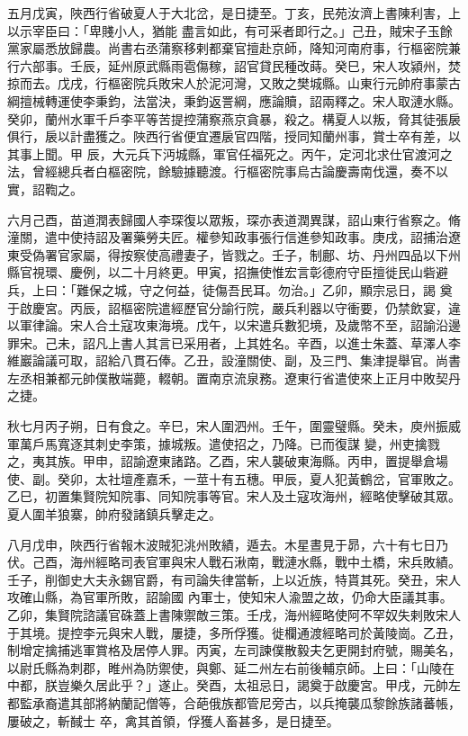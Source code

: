 \begin{pinyinscope}
 五月戊寅，陜西行省破夏人于大北岔，是日捷至。丁亥，民苑汝濟上書陳利害，上以示宰臣曰：「卑賤小人，猶能
 盡言如此，有可采者即行之。」己丑，賊宋子玉餘黨家屬悉放歸農。尚書右丞蒲察移剌都棄官擅赴京師，降知河南府事，行樞密院兼行六部事。壬辰，延州原武縣雨雹傷稼，詔官貸民種改蒔。癸巳，宋人攻潁州，焚掠而去。戊戌，行樞密院兵敗宋人於泥河灣，又敗之樊城縣。山東行元帥府事蒙古綱擅械轉運使李秉鈞，法當決，秉鈞返詈綱，應論贖，詔兩釋之。宋人取漣水縣。癸卯，蘭州水軍千戶李平等苦提控蒲察燕京貪暴，殺之。構夏人以叛，脅其徒張扆俱行，扆以計盡獲之。陜西行省便宜遷扆官四階，授同知蘭州事，賞士卒有差，以其事上聞。甲
 辰，大元兵下沔城縣，軍官任福死之。丙午，定河北求仕官渡河之法，曾經總兵者白樞密院，餘驗據聽渡。行樞密院事烏古論慶壽南伐還，奏不以實，詔鞫之。



 六月己酉，苗道潤表歸國人李琛復以眾叛，琛亦表道潤異謀，詔山東行省察之。脩潼關，遣中使持詔及署藥勞夫匠。權參知政事張行信進參知政事。庚戌，詔捕治遼東受偽署官家屬，得按察使高禮妻子，皆戮之。壬子，制鄜、坊、丹州四品以下州縣官視環、慶例，以二十月終更。甲寅，招撫使惟宏言彰德府守臣擅徙民山砦避兵，上曰：「難保之城，守之何益，徒傷吾民耳。勿治。」乙卯，顯宗忌日，謁
 奠于啟慶宮。丙辰，詔樞密院遣經歷官分諭行院，嚴兵利器以守衝要，仍禁飲宴，違以軍律論。宋人合土寇攻東海境。戊午，以宋遣兵數犯境，及歲幣不至，詔諭沿邊罪宋。己未，詔凡上書人其言已采用者，上其姓名。辛酉，以進士朱蓋、草澤人李維巖論議可取，詔給八貫石俸。乙丑，設潼關使、副，及三門、集津提舉官。尚書左丞相兼都元帥僕散端薨，輟朝。置南京流泉務。遼東行省遣使來上正月中敗契丹之捷。



 秋七月丙子朔，日有食之。辛巳，宋人圍泗州。壬午，圍靈璧縣。癸未，庾州振威軍萬戶馬寬逐其刺史李策，據城叛。遣使招之，乃降。已而復謀
 變，州吏擒戮之，夷其族。甲申，詔諭遼東諸路。乙酉，宋人襲破東海縣。丙申，置提舉倉場使、副。癸卯，太社壇產嘉禾，一莖十有五穗。甲辰，夏人犯黃鶴岔，官軍敗之。乙巳，初置集賢院知院事、同知院事等官。宋人及土寇攻海州，經略使擊破其眾。夏人圍羊狼寨，帥府發諸鎮兵擊走之。



 八月戊申，陜西行省報木波賊犯洮州敗績，遁去。木星晝見于昴，六十有七日乃伏。己酉，海州經略司表官軍與宋人戰石湫南，戰漣水縣，戰中土橋，宋兵敗績。壬子，削御史大夫永錫官爵，有司論失律當斬，上以近族，特貰其死。癸丑，宋人攻確山縣，為官軍所敗，詔諭國
 內軍士，使知宋人渝盟之故，仍命大臣議其事。乙卯，集賢院諮議官硃蓋上書陳禦敵三策。壬戌，海州經略使阿不罕奴失剌敗宋人于其境。提控李元與宋人戰，屢捷，多所俘獲。徙欄通渡經略司於黃陵崗。乙丑，制增定擒捕逃軍賞格及居停人罪。丙寅，左司諫僕散毅夫乞更開封府號，賜美名，以尉氏縣為刺郡，睢州為防禦使，與鄭、延二州左右前後輔京師。上曰：「山陵在中都，朕豈樂久居此乎？」遂止。癸酉，太祖忌日，謁奠于啟慶宮。甲戌，元帥左都監承裔遣其部將納蘭記僧等，合葩俄族都管尼旁古，以兵掩襲瓜黎餘族諸蕃帳，屢破之，斬馘士
 卒，禽其首領，俘獲人畜甚多，是日捷至。




\end{pinyinscope}
